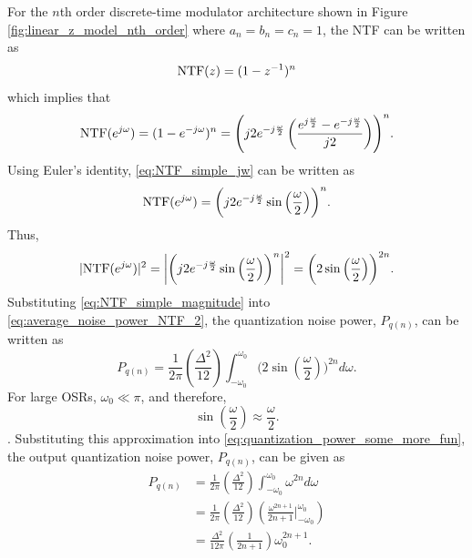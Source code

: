 For the $n$th order discrete-time \DS modulator architecture shown in Figure
\ref{fig:linear_z_model_nth_order} where $a_n=b_n=c_n=1$, the NTF can be written as 
\begin{equation}\label{eq:NTF_simple_z}
\mathop\text{NTF}(z)=(1-z^{-1})^n
\end{equation}
which implies that 
\begin{equation}\label{eq:NTF_simple_jw}
\mathop\text{NTF}(e^{j\omega})=(1-e^{-j\omega})^n=\Biggl(j2e^{-j\frac{\omega}{2}}
\left(\frac{e^{j\frac{\omega}{2}}-e^{-j\frac{\omega}{2}}}{j2}\right)\Biggr)^n.
\end{equation}
Using Euler's identity\cite{thomas_thomas_2004}, \eqref{eq:NTF_simple_jw} can be written
as
\begin{equation}\label{eq:NTF_simple_euler}
\mathop\text{NTF}(e^{j\omega})=\biggl(j2e^{-j\frac{\omega}{2}}\sin\left(\frac{\omega}{2}
\right)\biggr)^n.
\end{equation}
Thus, 
\begin{equation}\label{eq:NTF_simple_magnitude}
\lvert \mathop\text{NTF}(e^{j\omega})\rvert^2=\biggl\lvert
\biggl(j2e^{-j\frac{\omega}{2}}\sin\left(\frac{\omega}{2}
\right)\biggr)^n \biggr\rvert^2 = \biggl(2\sin\left(\frac{\omega}{2}\right)\biggr)^{2n}.
\end{equation}
Substituting \eqref{eq:NTF_simple_magnitude} into \eqref{eq:average_noise_power_NTF_2},
the quantization noise power, $P_{q(n)}$, can be written as
\begin{equation}\label{eq:quantization_power_some_more_fun}
P_{q(n)}=\frac{1}{2\pi}\left(\frac{\Delta^2}{12}\right)
\int_{-\omega_0}^{\omega_0}\biggl(2\sin\left(\frac{\omega}{2}\right)\biggr)^{2n}
d\omega.
\end{equation}
For large OSRs, $\omega_0\ll\pi$, and therefore,
$$\sin\left(\frac{\omega}{2}\right)\approx\frac{\omega}{2}.$$
\cite{schreier_understanding_2004}\cite{thomas_thomas_2004}\cite{kozak_oversampled_2003}.
Substituting this approximation into \eqref{eq:quantization_power_some_more_fun}, the
output quantization noise power, $P_{q(n)}$, can be given as 
\begin{equation}\label{eq:average_noise_power_NTF_3}
\begin{split}
P_{q(n)}&
=\frac{1}{2\pi}\left(\frac{\Delta^2}{12}\right)\int_{-\omega_0}^{\omega_0}\omega^{2n}
d\omega\\
& =
\frac{1}{2\pi}\left(\frac{\Delta^2}{12}\right)\left(\frac{\omega^{2n+1}}{2n+1}\biggl\vert_
{-\omega_0 }^{ \omega_0}\right)\\
&
=\frac{\Delta^2}{12\pi}\left(\frac{1}{2n+1}\right)\omega_0^{2n+1}.
\end{split}
\end{equation}
